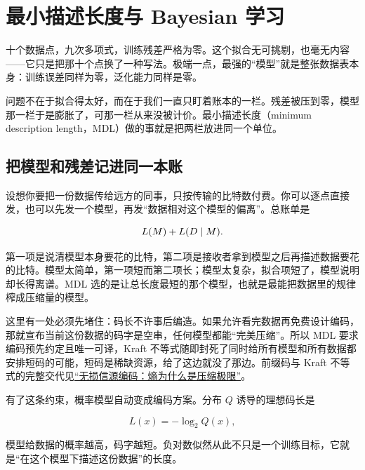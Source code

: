 \section{最小描述长度与 Bayesian 学习}
\label{sec:07-Information-Theory/06-Information-and-Learning/02}

十个数据点，九次多项式，训练残差严格为零。这个拟合无可挑剔，也毫无内容——它只是把那十个点换了一种写法。极端一点，最强的``模型''就是整张数据表本身：训练误差同样为零，泛化能力同样是零。

问题不在于拟合得太好，而在于我们一直只盯着账本的一栏。残差被压到零，模型那一栏于是膨胀了，可那一栏从来没被计价。最小描述长度（minimum description length，MDL）做的事就是把两栏放进同一个单位。

\subsection{把模型和残差记进同一本账}

设想你要把一份数据传给远方的同事，只按传输的比特数付费。你可以逐点直接发，也可以先发一个模型，再发``数据相对这个模型的偏离''。总账单是

\[
L(M)+L(D\mid M).
\]

第一项是说清模型本身要花的比特，第二项是接收者拿到模型之后再描述数据要花的比特。模型太简单，第一项短而第二项长；模型太复杂，拟合项短了，模型说明却长得离谱。MDL 选的是让总长度最短的那个模型，也就是最能把数据里的规律榨成压缩量的模型。

这里有一处必须先堵住：码长不许事后编造。如果允许看完数据再免费设计编码，那就宣布当前这份数据的码字是空串，任何模型都能``完美压缩''。所以 MDL 要求编码预先约定且唯一可译，Kraft 不等式随即封死了同时给所有模型和所有数据都安排短码的可能，短码是稀缺资源，给了这边就没了那边。前缀码与 Kraft 不等式的完整交代见\hyperref[ch:057]{``无损信源编码：熵为什么是压缩极限''}。

有了这条约束，概率模型自动变成编码方案。分布 \(Q\) 诱导的理想码长是

\[
L(x)=-\log_2 Q(x),
\]

模型给数据的概率越高，码字越短。负对数似然从此不只是一个训练目标，它就是``在这个模型下描述这份数据''的长度。

